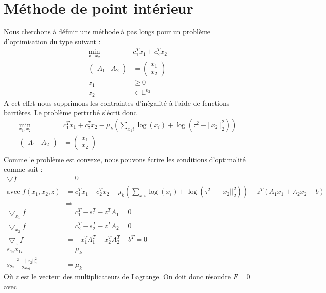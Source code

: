 \section{Méthode de point intérieur}

Nous cherchons à définir une méthode à pas longs pour un problème d'optimisation du type suivant :
\begin{align*}
\min_{x_1,x_2} & c_1^Tx_1+c_2^Tx_2\\
\begin{pmatrix} A_1 & A_2 \end{pmatrix}
& = \begin{pmatrix} x_1 \\ x_2 \end{pmatrix} \\
x_1 & \geq 0 \\
x_2 & \in \mathbb{L}^{n_2}
\end{align*}
A cet effet nous supprimons les contraintes d'inégalité à l'aide de fonctions barrières. Le problème perturbé s'écrit donc
\begin{align*}
\min_{x_1,x_2}  & c_1^Tx_1+c_2^Tx_2 - \mu_k(\sum_{x_1i} \log(x_i)+ \log(\tau^2 - ||x_2||_2^2)) \\
\begin{pmatrix} A_1 & A_2 \end{pmatrix}
& = \begin{pmatrix} x_1 \\ x_2 \end{pmatrix} \\
\end{align*}
Comme le problème est convexe, nous pouvons écrire les conditions d'optimalité comme suit :
\begin{align*}
\bigtriangledown f & =  0 \\
\text{avec }f(x_1,x_2,z) & = 
c_1^Tx_1+c_2^Tx_2 - \mu_k(\sum_{x_1i} \log(x_i)+ \log(\tau^2 - ||x_2||_2^2)) -z^T(A_1x_1+A_2x_2-b)\\
& \Rightarrow & \\
\bigtriangledown_{x_1}f & =  c_1^T -s_1^T -z^TA_1 = 0 \\
\bigtriangledown_{x_2}f & =  c_2^T -s_2^T - z^TA_2 = 0 \\
\bigtriangledown_{z}f & =  -x_1^TA_1^T-x_2^TA_2^T+b^T = 0 \\
s_{1i} x_{1i} & = \mu_k \\
s_{2i} \frac{\tau^2 - ||x_{2}||_2^2}{2x_{2i}} & = \mu_k
\end{align*}
Où $z$ est le vecteur des multiplicateurs de Lagrange. On doit donc résoudre $F=0 $ avec 
